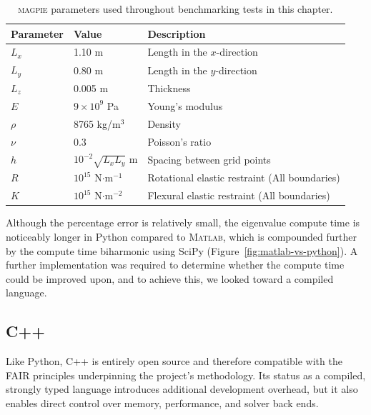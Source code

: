 \begin{table}
	\centering
	\begin{tabular}{lll}
		\hline
		\textbf{Parameter} & \textbf{Value}             & \textbf{Description}                          \\ \hline
		$L_x$              & 1.10 m                     & Length in the $x$-direction                   \\ 
		$L_y$              & 0.80 m                     & Length in the $y$-direction                   \\ 
		$L_z$              & 0.005 m                    & Thickness                                     \\ 
		$E$                & $9\times 10^{9}$ Pa        & Young's modulus                               \\ 
		$\rho$             & 8765 kg/m$^3$              & Density                                       \\ 
		$\nu$              & 0.3                        & Poisson's ratio                               \\ 
		$h$                & $10^{-2}\sqrt{L_x L_y}$ m  & Spacing between grid points                   \\ 
		$R$                & $10^{15}$ N$\cdot$m$^{-1}$ & Rotational elastic restraint (All boundaries) \\ 
		$K$                & $10^{15}$ N$\cdot$m$^{-2}$ & Flexural elastic restraint (All boundaries)   \\ \hline	
	\end{tabular}
    \caption[\textsc{magpie} parameters]{\textsc{magpie} parameters used throughout benchmarking tests in this chapter.}
	\label{tab:parameters}
\end{table}

Although the percentage error is relatively small, the eigenvalue compute time is noticeably longer in Python compared to M\textsc{atlab}, which is compounded further by the compute time biharmonic using SciPy (Figure~\ref{fig:matlab-vs-python}).
A further implementation was required to determine whether the compute time could be improved upon, and to achieve this, we looked toward a compiled language.

\subsection{C\textsc{++}}

Like Python, C\textsc{++} is entirely open source and therefore compatible with the FAIR principles underpinning the project’s methodology. Its status as a compiled, strongly typed language introduces additional development overhead, but it also enables direct control over memory, performance, and solver back ends.

